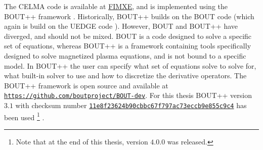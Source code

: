 \label{chap:BOUT++}
The CELMA code is available at \href{FIXME}{FIMXE}, and is implemented using the BOUT++ framework \cite{Dudson2009,Dudson2014a,Dudson2016}.
Historically, BOUT++ builds on the BOUT code \cite{Xu1998} (which again is build on the UEDGE code \cite{Rognlien1996}).
However, BOUT and BOUT++ have diverged, and should not be mixed.
BOUT is a code designed to solve a specific set of equations, whereas BOUT++ is a framework containing tools specifically designed to solve magnetized plasma equations, and is not bound to a specific model.
In BOUT++ the user can specify what set of equations solve to solve for, what built-in solver to use and how to discretize the derivative operators.
The BOUT++ framework is open source and available at \href{https://github.com/boutproject/BOUT-dev}{\texttt{https://github.com/boutproject/BOUT-dev}}.
For this thesis BOUT++ version $3.1$ with checksum number \href{https://github.com/boutproject/BOUT-dev/releases/tag/v3.1}{\texttt{11e8f23624b90cbbc67f797ac73eccb9e855c9c4}} has been used%
%
\footnote{Note that at the end of this thesis, version $4.0.0$ was released.}%
%
.

